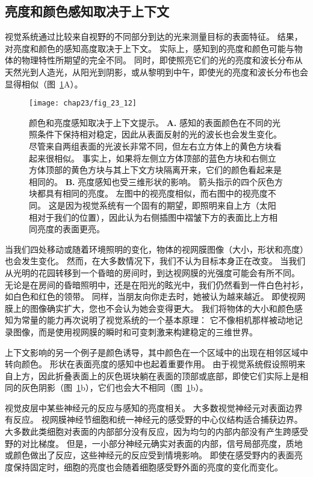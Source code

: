 \subsection{亮度和颜色感知取决于上下文}

视觉系统通过比较来自视野的不同部分到达的光来测量目标的表面特征。
结果，对亮度和颜色的感知高度取决于上下文。
实际上，感知到的亮度和颜色可能与物体的物理特性所期望的完全不同。
同时，即使照亮它们的光的亮度和波长分布从天然光到人造光，从阳光到阴影，或从黎明到中午，即使光的亮度和波长分布也会显得相似（图~\ref{fig:23_12}A）。


\begin{figure}[htbp]
	\centering
	\texttt{[image: chap23/fig\_23\_12]}
	\caption{颜色和亮度感知取决于上下文提示。
		\textbf{A.} 感知的表面颜色在不同的光照条件下保持相对稳定，因此从表面反射的光的波长也会发生变化。
		尽管来自两组表面的光波长非常不同，但左右立方体上的黄色方块看起来很相似。
		事实上，如果将左侧立方体顶部的蓝色方块和右侧立方体顶部的黄色方块与其上下文方块隔离开来，它们的颜色看起来是相同的。
		\textbf{B.} 亮度感知也受三维形状的影响。
		箭头指示的四个灰色方块都具有相同的亮度。
		左图中的视亮度相似，而右图中的视亮度不同。
		这是因为视觉系统有一个固有的期望，即照明来自上方（太阳相对于我们的位置），因此认为右侧插图中褶皱下方的表面比上方相同亮度的表面更亮\cite{adelson1993perceptual}。}
	\label{fig:23_12}
\end{figure}


当我们四处移动或随着环境照明的变化，物体的视网膜图像（大小，形状和亮度）也会发生变化。
然而，在大多数情况下，我们不认为目标本身正在改变。
当我们从光明的花园转移到一个昏暗的房间时，到达视网膜的光强度可能会有所不同。
无论是在房间的昏暗照明中，还是在阳光的眩光中，我们仍然看到一件白色衬衫，如白色和红色的领带。
同样，当朋友向你走去时，她被认为越来越近。
即使视网膜上的图像确实扩大，您也不会认为她会变得更大。
我们将物体的大小和颜色感知为常量的能力再次说明了视觉系统的一个基本原理：
它不像相机那样被动地记录图像，而是使用视网膜的瞬时和可变刺激来构建稳定的三维世界。


上下文影响的另一个例子是颜色诱导，其中颜色在一个区域中的出现在相邻区域中转向颜色。
形状在表面亮度的感知中也起着重要作用。
由于视觉系统假设照明来自上方，因此折叠表面上的灰色斑块躺在表面的顶部或底部，即使它们实际上是相同的灰色阴影（图~\ref{fig:23_12}b），它们也会大不相同（图~\ref{fig:23_12}b）。


视觉皮层中某些神经元的反应与感知的亮度相关。
大多数视觉神经元对表面边界有反应。
视网膜神经节细胞和统一神经元的感受野的中心仪结构适合捕获边界。
大多数此类细胞对表面的内部部分没有反应，因为均匀的内部内部没有产生跨感受野的对比梯度。
但是，一小部分神经元确实对表面的内部，信号局部亮度，质地或颜色做出了反应，这些神经元的反应受到情境影响。
即使在感受野内的表面亮度保持固定时，细胞的亮度也会随着细胞感受野外面的亮度的变化而变化。


